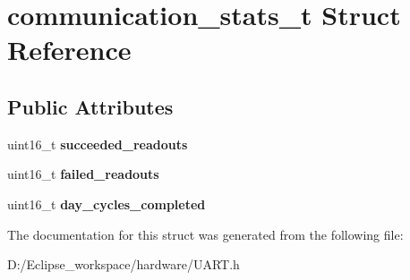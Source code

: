 \hypertarget{structcommunication__stats__t}{}\section{communication\+\_\+stats\+\_\+t Struct Reference}
\label{structcommunication__stats__t}
\subsection*{Public Attributes}
\begin{DoxyCompactItemize}
\item 
\hypertarget{structcommunication__stats__t_a54579dec5936dea08811206ebfc7a3b4}{}uint16\+\_\+t {\bfseries succeeded\+\_\+readouts}\label{structcommunication__stats__t_a54579dec5936dea08811206ebfc7a3b4}

\item 
\hypertarget{structcommunication__stats__t_acf6aecf0bdbf15ac4fc1d462e74c49ea}{}uint16\+\_\+t {\bfseries failed\+\_\+readouts}\label{structcommunication__stats__t_acf6aecf0bdbf15ac4fc1d462e74c49ea}

\item 
\hypertarget{structcommunication__stats__t_a92ef859a64364e26aa33cc5b2ea11152}{}uint16\+\_\+t {\bfseries day\+\_\+cycles\+\_\+completed}\label{structcommunication__stats__t_a92ef859a64364e26aa33cc5b2ea11152}

\end{DoxyCompactItemize}


The documentation for this struct was generated from the following file\+:\begin{DoxyCompactItemize}
\item 
D\+:/\+Eclipse\+\_\+workspace/hardware/U\+A\+R\+T.\+h\end{DoxyCompactItemize}
